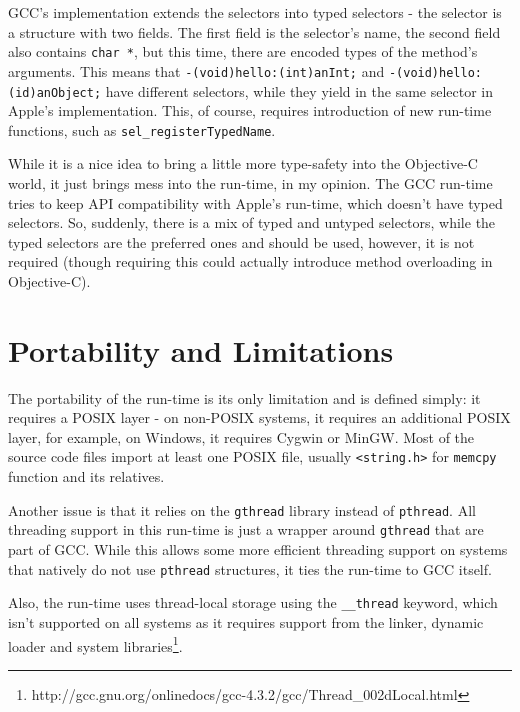 GCC's implementation extends the selectors into typed selectors - the selector is a structure with two fields. The first field is the selector's name, the second field also contains \verb=char *=, but this time, there are encoded types of the method's arguments. This means that \verb=-(void)hello:(int)anInt;= and \verb=-(void)hello:(id)anObject;= have different selectors, while they yield in the same selector in Apple's implementation. This, of course, requires introduction of new run-time functions, such as \verb=sel_registerTypedName=.

While it is a nice idea to bring a little more type-safety into the Objective-C world, it just brings mess into the run-time, in my opinion. The GCC run-time tries to keep API compatibility with Apple's run-time, which doesn't have typed selectors. So, suddenly, there is a mix of typed and untyped selectors, while the typed selectors are the preferred ones and should be used, however, it is not required (though requiring this could actually introduce method overloading in Objective-C).

\section{Portability and Limitations}

The portability of the run-time is its only limitation and is defined simply: it requires a POSIX layer - on non-POSIX systems, it requires an additional POSIX layer, for example, on Windows, it requires Cygwin or MinGW. Most of the source code files import at least one POSIX file, usually \verb=<string.h>= for \verb=memcpy= function and its relatives.

Another issue is that it relies on the \verb=gthread= library instead of \verb=pthread=. All threading support in this run-time is just a wrapper around \verb=gthread= that are part of GCC. While this allows some more efficient threading support on systems that natively do not use \verb=pthread= structures, it ties the run-time to GCC itself.

Also, the run-time uses thread-local storage using the \verb=__thread= keyword, which isn't supported on all systems as it requires support from the linker, dynamic loader and system libraries\footnote{http://gcc.gnu.org/onlinedocs/gcc-4.3.2/gcc/Thread\_002dLocal.html}.

